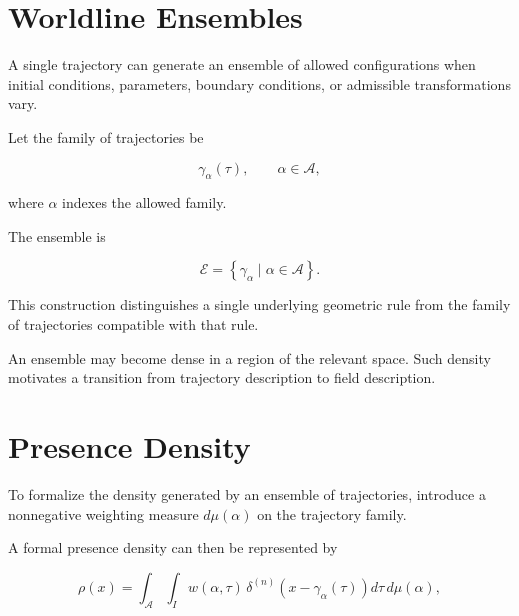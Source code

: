\documentclass[12pt,oneside]{book}
\begin{document}

\section{Worldline Ensembles}
\label{sec:worldline-ensembles}

A single trajectory can generate an ensemble of allowed
configurations when initial conditions, parameters, boundary
conditions, or admissible transformations vary.

Let the family of trajectories be

\begin{equation}
    \gamma_\alpha(\tau),
    \qquad
    \alpha\in\mathcal{A},
    \label{eq:trajectory-family}
\end{equation}

where \(\alpha\) indexes the allowed family.

The ensemble is

\begin{equation}
    \mathscr{E}
    =
    \left\{
        \gamma_\alpha
        \mid
        \alpha\in\mathcal{A}
    \right\}.
    \label{eq:trajectory-ensemble}
\end{equation}

This construction distinguishes a single underlying geometric
rule from the family of trajectories compatible with that rule.

An ensemble may become dense in a region of the relevant space.
Such density motivates a transition from trajectory description
to field description.


\section{Presence Density}
\label{sec:presence-density}

To formalize the density generated by an ensemble of
trajectories, introduce a nonnegative weighting measure
\(d\mu(\alpha)\) on the trajectory family.

A formal presence density can then be represented by

\begin{equation}
    \rho(x)
    =
    \int_{\mathcal{A}}
    \int_I
        w(\alpha,\tau)
        \,
        \delta^{(n)}
        \left(
            x-\gamma_\alpha(\tau)
        \right)
    d\tau
    \,d\mu(\alpha),
    \label{eq:presence-density}
\end{equation}
\end{document}
